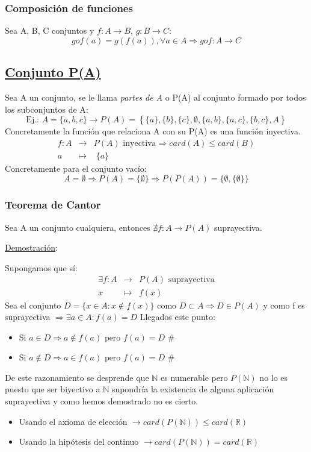 \documentclass[10pt,a4paper,openright]{book}
\theoremstyle{break}
\begin{document}
\subsubsection{Composición de funciones}
Sea A, B, C conjuntos y $f: A\rightarrow B$, $g: B\rightarrow C$:
$$gof(a)=g\left(f(a)\right),\forall a \in A\Rightarrow gof: A\rightarrow C$$

\subsection{\underline{Conjunto P(A)}}
Sea A un conjunto, se le llama \textit{partes de A} o P(A) al conjunto formado por todos los subconjuntos de A:
$$\mbox{Ej.: } A=\{a,b,c\}\rightarrow P(A)=\left\lbrace \{a\}, \{b\},\{c\}, \emptyset, \{a,b\}, \{a,c\}, \{b,c\}, A \right\rbrace$$
Concretamente la función que relaciona A con su P(A) es una función inyectiva.
\begin{eqnarray*}
f: A & \rightarrow & P(A)\mbox{ inyectiva}\Rightarrow card(A)\leq card(B)\\
a & \longmapsto  & \; \{a\}
\end{eqnarray*}
Concretamente para el conjunto vacío:
$$A=\emptyset \Rightarrow P(A)=\{\emptyset\} \Rightarrow P(P(A))=\{\emptyset, \{\emptyset\}\}$$

\subsubsection{Teorema de Cantor}
Sea A un conjunto cualquiera, entonces $\nexists f: A \rightarrow P(A)$  suprayectiva.\par
\underline{Demostración}:\par
Supongamos que sí:
\begin{eqnarray*}
\exists f: A &\rightarrow & P(A)\mbox{ suprayectiva} \\
x & \longmapsto & f(x)
\end{eqnarray*}
Sea el conjunto $D=\{ x\in A: x\notin f(x)\}$ como $D\subset A\Rightarrow D\in P(A)$ y como f es suprayectiva $\Rightarrow \exists a \in A : f(a)=D$
Llegados este punto:
\begin{itemize}
\item Si $a\in D\Rightarrow a\notin f(a)\mbox{ pero }f(a)=D \mbox{ \#}$
\item Si $a\notin D\Rightarrow a\in f(a)\mbox{ pero }f(a)=D \mbox{ \#}$
\end{itemize}

De este razonamiento se desprende que $\mathbb N$ es numerable pero $P(\mathbb N )$ no lo es puesto que ser biyectivo a $\mathbb N$ supondría la existencia de alguna aplicación suprayectiva y como hemos demostrado no es cierto.
\begin{itemize}
\item Usando el axioma de elección $\rightarrow card(P(\mathbb N))\leq card (\mathbb R)$
\item Usando la hipótesis del continuo $\rightarrow card(P(\mathbb N))= card (\mathbb R)$
\end{itemize}
\end{document}
